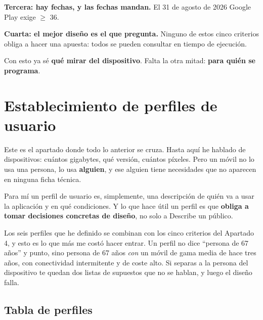 \textbf{Tercera: hay fechas, y las fechas mandan.} El 31 de agosto de 2026 Google Play exige  $\geq$ 36.

\textbf{Cuarta: el mejor diseño es el que pregunta.} Ninguno de estos cinco criterios obliga a hacer una apuesta: todos se pueden consultar en tiempo de ejecución.

Con esto ya sé \textbf{qué mirar del dispositivo}. Falta la otra mitad: \textbf{para quién se programa}.

\newpage
\section{Establecimiento de perfiles de usuario}

Este es el apartado donde todo lo anterior se cruza. Hasta aquí he hablado de dispositivos: cuántos gigabytes, qué versión, cuántos píxeles. Pero un móvil no lo usa una persona, lo usa \textbf{alguien}, y ese alguien tiene necesidades que no aparecen en ninguna ficha técnica.

Para mí un perfil de usuario es, simplemente, una descripción de quién va a usar la aplicación y en qué condiciones. Y lo que hace útil un perfil es que \textbf{obliga a tomar decisiones concretas de diseño}, no solo a Describe un público.

Los seis perfiles que he definido se combinan con los cinco criterios del Apartado 4, y esto es lo que más me costó hacer entrar. Un perfil no dice \enquote{persona de 67 años} y punto, sino persona de 67 años \emph{con} un móvil de gama media de hace tres años, con conectividad intermitente y de coste alto. Si separas a la persona del dispositivo te quedan dos listas de supuestos que no se hablan, y luego el diseño falla.

\subsection{Tabla de perfiles}

